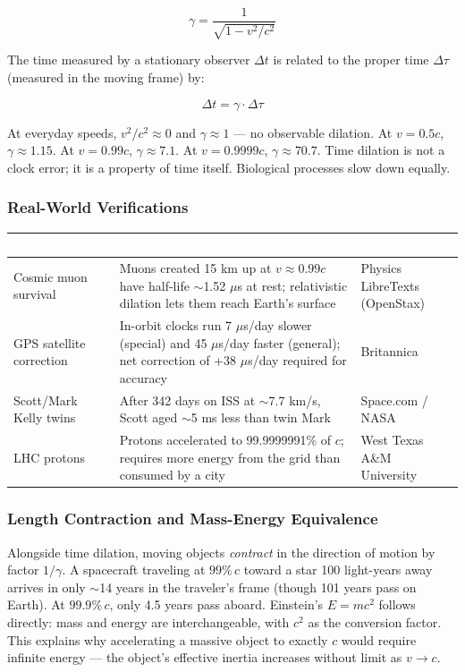 \documentclass[11pt,letterpaper]{article}
\newcommand{\tableheader}[1]{\textbf{\sffamily\textcolor{white}{#1}}}
\begin{document}
\[ \gamma = \frac{1}{\sqrt{1 - v^2/c^2}} \]

The time measured by a stationary observer $\Delta t$ is related to the proper time $\Delta\tau$ (measured in the moving frame) by:

\[ \Delta t = \gamma \cdot \Delta\tau \]

At everyday speeds, $v^2/c^2 \approx 0$ and $\gamma \approx 1$ --- no observable dilation. At $v = 0.5c$, $\gamma \approx 1.15$. At $v = 0.99c$, $\gamma \approx 7.1$. At $v = 0.9999c$, $\gamma \approx 70.7$. Time dilation is not a clock error; it is a property of time itself. Biological processes slow down equally.

\subsubsection{Real-World Verifications}

\begin{center}
\begin{tabularx}{\textwidth}{L{3.5cm}XL{3cm}}
\toprule
{}
\tableheader{Phenomenon} & \tableheader{Description} & \tableheader{Source} \\
\midrule
Cosmic muon survival & Muons created 15 km up at $v\approx 0.99c$ have half-life $\sim$1.52 $\mu$s at rest; relativistic dilation lets them reach Earth's surface & Physics LibreTexts (OpenStax) \\
GPS satellite correction & In-orbit clocks run 7 $\mu$s/day slower (special) and 45 $\mu$s/day faster (general); net correction of +38 $\mu$s/day required for accuracy & Britannica \\
Scott/Mark Kelly twins & After 342 days on ISS at $\sim$7.7 km/s, Scott aged $\sim$5 ms less than twin Mark & Space.com / NASA \\
LHC protons & Protons accelerated to 99.9999991\% of $c$; requires more energy from the grid than consumed by a city & West Texas A\&M University \\
\bottomrule
\end{tabularx}
\end{center}

\subsubsection{Length Contraction and Mass-Energy Equivalence}

Alongside time dilation, moving objects \textit{contract} in the direction of motion by factor $1/\gamma$. A spacecraft traveling at $99\%\, c$ toward a star 100 light-years away arrives in only $\sim$14 years in the traveler's frame (though 101 years pass on Earth). At $99.9\%\, c$, only 4.5 years pass aboard. Einstein's $E = mc^2$ follows directly: mass and energy are interchangeable, with $c^2$ as the conversion factor. This explains why accelerating a massive object to exactly $c$ would require infinite energy --- the object's effective inertia increases without limit as $v \to c$.
\end{document}
